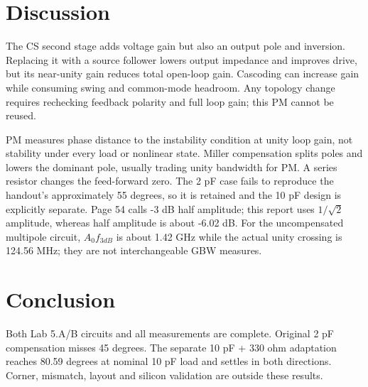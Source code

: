 \section{Discussion}
The CS second stage adds voltage gain but also an output pole and inversion. Replacing it with a source follower lowers output impedance and improves drive, but its near-unity gain reduces total open-loop gain. Cascoding can increase gain while consuming swing and common-mode headroom. Any topology change requires rechecking feedback polarity and full loop gain; this PM cannot be reused.

PM measures phase distance to the instability condition at unity loop gain, not stability under every load or nonlinear state. Miller compensation splits poles and lowers the dominant pole, usually trading unity bandwidth for PM. A series resistor changes the feed-forward zero. The 2 pF case fails to reproduce the handout's approximately 55 degrees, so it is retained and the 10 pF design is explicitly separate. Page 54 calls -3 dB half amplitude; this report uses $1/\sqrt2$ amplitude, whereas half amplitude is about -6.02 dB. For the uncompensated multipole circuit, $A_0f_{3dB}$ is about 1.42 GHz while the actual unity crossing is 124.56 MHz; they are not interchangeable GBW measures.

\section{Conclusion}
Both Lab 5.A/B circuits and all measurements are complete. Original 2 pF compensation misses 45 degrees. The separate 10 pF + 330 ohm adaptation reaches 80.59 degrees at nominal 10 pF load and settles in both directions. Corner, mismatch, layout and silicon validation are outside these results.

